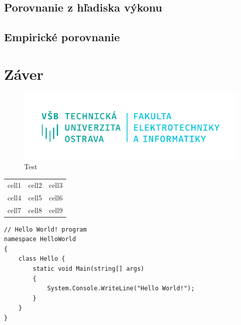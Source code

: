 \documentclass[slovak, master]{diploma}
\begin{document}
\section{Porovnanie z hľadiska výkonu}
\label{sec:Performance}
\section{Empirické porovnanie}
\label{sec:Gameplay}

\chapter{Záver}
\label{sec:Conclusion}

\begin{figure}[!htbp]
	\centering
	\includegraphics[width=.5\textwidth]{Figures/FEI_CZ.pdf}
	\caption{Test}
	\label{pic:Teeest}
\end{figure}

\begin{center}
\begin{tabular}{ c c c }
 cell1 & cell2 & cell3 \\ 
 cell4 & cell5 & cell6 \\  
 cell7 & cell8 & cell9    
\end{tabular}
\end{center}

\begin{lstlisting}[label=src:Test,caption={Test}]
// Hello World! program
namespace HelloWorld
{
    class Hello {         
        static void Main(string[] args)
        {
            System.Console.WriteLine("Hello World!");
        }
    }
}
\end{lstlisting}

%

\printbibliography[title={Literatúra}, heading=bibintoc]
\end{document}
